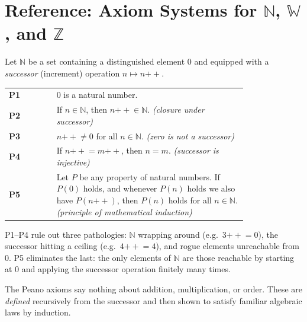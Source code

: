 
\section{Reference: Axiom Systems for $\mathbb{N}$, $\mathbb{W}$, and $\mathbb{Z}$}
\label{sec:nz-axioms-reference}


\begin{tcolorbox}[colback=axiombox, colframe=axiomborder, arc=2pt,
  left=6pt, right=6pt, top=4pt, bottom=4pt,
  title={\small\textbf{Peano Axioms for $\mathbb{N}$ (Tao \S2.1)}},
  fonttitle=\small\bfseries]

Let $\mathbb{N}$ be a set containing a distinguished element $0$
and equipped with a \emph{successor} (increment) operation
$n \mapsto n{+\!\!+}$.

\medskip
\begin{tabular}{@{} l p{0.80\linewidth} @{}}
\textbf{P1} & $0$ is a natural number. \\[4pt]
\textbf{P2} & If $n \in \mathbb{N}$, then $n{+\!\!+} \in \mathbb{N}$.
             \hfill\textit{(closure under successor)} \\[4pt]
\textbf{P3} & $n{+\!\!+} \neq 0$ for all $n \in \mathbb{N}$.
             \hfill\textit{(zero is not a successor)} \\[4pt]
\textbf{P4} & If $n{+\!\!+} = m{+\!\!+}$, then $n = m$.
             \hfill\textit{(successor is injective)} \\[4pt]
\textbf{P5} & Let $P$ be any property of natural numbers.
             If $P(0)$ holds, and whenever $P(n)$ holds we also have
             $P(n{+\!\!+})$, then $P(n)$ holds for all $n \in \mathbb{N}$.
             \hfill\textit{(principle of mathematical induction)} \\
\end{tabular}
\end{tcolorbox}

\begin{remark}
P1--P4 rule out three pathologies: $\mathbb{N}$ wrapping around
(e.g.\ $3{+\!\!+} = 0$), the successor hitting a ceiling
(e.g.\ $4{+\!\!+} = 4$), and rogue elements unreachable from $0$.
P5 eliminates the last: the only elements of $\mathbb{N}$ are those
reachable by starting at $0$ and applying the successor operation
finitely many times.

The Peano axioms say nothing about addition, multiplication, or order.
These are \emph{defined} recursively from the successor and then
shown to satisfy familiar algebraic laws by induction.
\end{remark}

